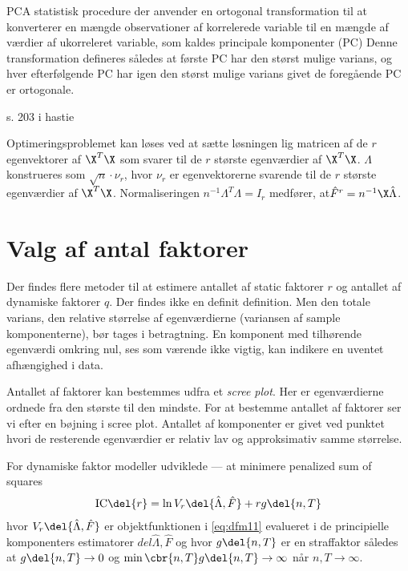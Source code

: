 PCA
statistisk procedure der anvender en ortogonal transformation til at konverterer en mængde observationer af korrelerede variable til en mængde af værdier af ukorreleret variable, som kaldes principale komponenter (PC)
Denne transformation defineres således at første PC har den størst mulige varians, og hver efterfølgende PC har igen den størst mulige varians givet de foregående PC er ortogonale.


s. 203 i hastie


Optimeringsproblemet kan løses ved at sætte løsningen lig matricen af de \(r\) egenvektorer af \(\X^T \X\) som svarer til de \(r\) største egenværdier af \(\X^T \X\).
\(\Lambda\) konstrueres som \(\sqrt{n} \cdot \nu_r\), hvor \(\nu_r\) er egenvektorerne svarende til de \(r\) største egenværdier af \(\X^T \X\).
Normaliseringen $n^{-1} \Lambda^T \Lambda=I_r$ medfører, at\(\hat{F}^r = n^{-1} \X \hat{\Lambda}\).


\section{Valg af antal faktorer}
Der findes flere metoder til at estimere antallet af static faktorer $r$ og antallet af dynamiske faktorer $q$.
Der findes ikke en definit definition.
Men den totale varians, den relative størrelse af egenværdierne (variansen af sample komponenterne), bør tages i betragtning.
En komponent med tilhørende egenværdi omkring nul, ses som værende ikke vigtig, kan indikere en uventet afhængighed i data.





Antallet af faktorer kan bestemmes udfra et \textit{scree plot}.
Her er egenværdierne ordnede fra den største til den mindste.
For at bestemme antallet af faktorer ser vi efter en bøjning i scree plot.
Antallet af komponenter er givet ved punktet hvori de resterende egenværdier er relativ lav og approksimativ samme størrelse.



For dynamiske faktor modeller udviklede --- at minimere penalized sum of squares
\begin{align*}
\text{IC} \del{r} = \ln V_r \del{\hat{\Lambda}, \hat{F}} + r g \del{n,T}
\end{align*}
hvor \(V_r \del{\hat{\Lambda}, \hat{F}}\) er objektfunktionen i \eqref{eq:dfm11} evalueret i de principielle komponenters estimatorer \(del{\hat{\Lambda}, \hat{F}}\) og hvor \(g \del{n,T}\) er en straffaktor således at \(g \del{n,T} \rightarrow 0\) og \(\min \cbr{n, T} g \del{n,T} \rightarrow \infty\) når \(n, T \rightarrow \infty\).

